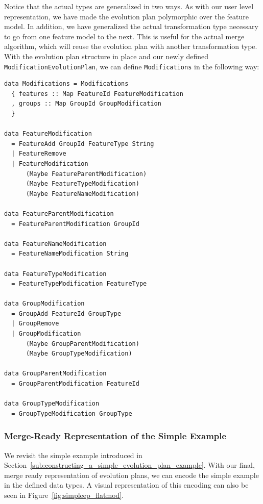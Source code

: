 \documentclass[a4paper,english]{ifimaster}
\begin{document}
Notice that the actual types are generalized in two ways. As with our user level representation, we have made the evolution plan polymorphic over the feature model. In addition, we have generalized the actual transformation type necessary to go from one feature model to the next. This is useful for the actual merge algorithm, which will reuse the evolution plan with another transformation type. With the evolution plan structure in place and our newly defined \texttt{ModificationEvolutionPlan}, we can define \texttt{Modifications} in the following way:

\begin{verbatim}
data Modifications = Modifications
  { features :: Map FeatureId FeatureModification
  , groups :: Map GroupId GroupModification
  }

data FeatureModification
  = FeatureAdd GroupId FeatureType String
  | FeatureRemove
  | FeatureModification
      (Maybe FeatureParentModification)
      (Maybe FeatureTypeModification)
      (Maybe FeatureNameModification)

data FeatureParentModification
  = FeatureParentModification GroupId

data FeatureNameModification
  = FeatureNameModification String

data FeatureTypeModification
  = FeatureTypeModification FeatureType

data GroupModification
  = GroupAdd FeatureId GroupType
  | GroupRemove
  | GroupModification
      (Maybe GroupParentModification)
      (Maybe GroupTypeModification)

data GroupParentModification
  = GroupParentModification FeatureId

data GroupTypeModification
  = GroupTypeModification GroupType
\end{verbatim}

\subsubsection{Merge-Ready Representation of the Simple Example}%
\label{ssub:merge_ready_representation_of_the_simple_example}

We revisit the simple example introduced in Section~\vref{sub:constructing_a_simple_evolution_plan_example}. With our final, merge ready representation of evolution plans, we can encode the simple example in the defined data types. A visual representation of this encoding can also be seen in Figure~\vref{fig:simpleep_flatmod}.
\end{document}
